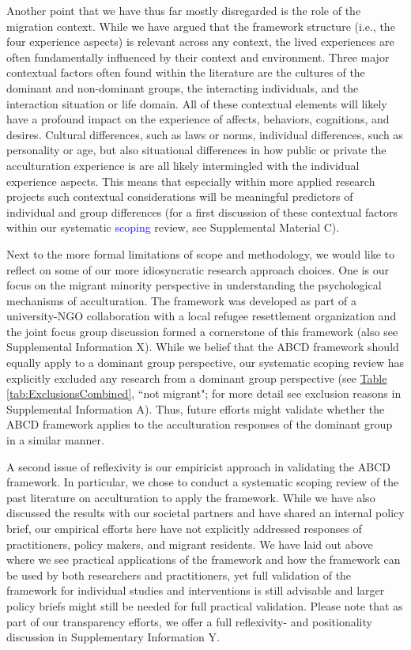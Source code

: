 \documentclass[man, 12pt, a4paper, mask]{apa7}
\begin{document}
Another point that we have thus far mostly disregarded is the role of the migration context. While we have argued that the framework structure (i.e., the four experience aspects) is relevant across any context, the lived experiences are often fundamentally influenced by their context and environment. Three major contextual factors often found within the literature are the cultures of the dominant and non-dominant groups, the interacting individuals, and the interaction situation or life domain. All of these contextual elements will likely have a profound impact on the experience of affects, behaviors, cognitions, and desires. Cultural differences, such as laws or norms, individual differences, such as personality or age, but also situational differences in how public or private the acculturation experience is are all likely intermingled with the individual experience aspects. This means that especially within more applied research projects such contextual considerations will be meaningful predictors of individual and group differences (for a first discussion of these contextual factors within our systematic \textcolor{blue}{scoping} review, see Supplemental Material C). 

Next to the more formal limitations of scope and methodology, we would like to
\color{blue}
reflect on some of our more idiosyncratic research approach choices. One is our focus on the migrant minority perspective in understanding the psychological mechanisms of acculturation. The framework was developed as part of a university-NGO collaboration with a local refugee resettlement organization and the joint focus group discussion formed a cornerstone of this framework (also see Supplemental Information X). While we belief that the ABCD framework should equally apply to a dominant group perspective, our systematic scoping review has explicitly excluded any research from a dominant group perspective (see \hyperref[tab:ExclusionsCombined]{Table \ref*{tab:ExclusionsCombined}}, ``not migrant"; for more detail see exclusion reasons in Supplemental Information A). Thus, future efforts might validate whether the ABCD framework applies to the acculturation responses of the dominant group in a similar manner.

A second issue of reflexivity is our empiricist approach in validating the ABCD framework. In particular, we chose to conduct a systematic scoping review of the past literature on acculturation to apply the framework. While we have also discussed the results with our societal partners and have shared an internal policy brief, our empirical efforts here have not explicitly addressed responses of practitioners, policy makers, and migrant residents. We have laid out above where we see practical applications of the framework and how the framework can be used by both researchers and practitioners, yet full validation of the framework for individual studies and interventions is still advisable and larger policy briefs might still be needed for full practical validation. Please note that as part of our transparency efforts, we offer a full reflexivity- and positionality discussion in Supplementary Information Y.
\color{black}
\end{document}
